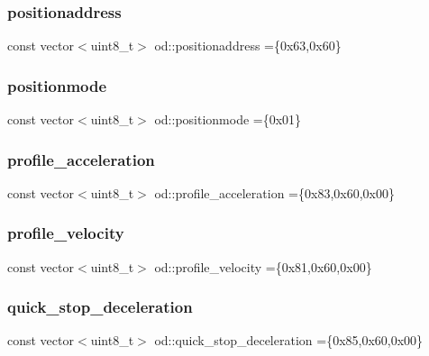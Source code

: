 \subsubsection{\texorpdfstring{positionaddress}{positionaddress}}
{\footnotesize\ttfamily const vector$<$uint8\+\_\+t$>$ od\+::positionaddress =\{0x63,0x60\}}

\mbox{\label{namespaceod_a85efca0656a6714d7227858e112c4a73}} 
\subsubsection{\texorpdfstring{positionmode}{positionmode}}
{\footnotesize\ttfamily const vector$<$uint8\+\_\+t$>$ od\+::positionmode =\{0x01\}}

\mbox{\label{namespaceod_aced8c17d62c0e774949057de0a99f402}} 
\subsubsection{\texorpdfstring{profile\+\_\+acceleration}{profile\_acceleration}}
{\footnotesize\ttfamily const vector$<$uint8\+\_\+t$>$ od\+::profile\+\_\+acceleration =\{0x83,0x60,0x00\}}

\mbox{\label{namespaceod_a47b7c8f6797cc134be5ee1d78d83ee50}} 
\subsubsection{\texorpdfstring{profile\+\_\+velocity}{profile\_velocity}}
{\footnotesize\ttfamily const vector$<$uint8\+\_\+t$>$ od\+::profile\+\_\+velocity =\{0x81,0x60,0x00\}}

\mbox{\label{namespaceod_a57361a1a6b60fd8b93c2828fd7f5429f}} 
\subsubsection{\texorpdfstring{quick\+\_\+stop\+\_\+deceleration}{quick\_stop\_deceleration}}
{\footnotesize\ttfamily const vector$<$uint8\+\_\+t$>$ od\+::quick\+\_\+stop\+\_\+deceleration =\{0x85,0x60,0x00\}}

